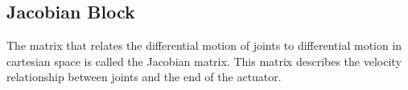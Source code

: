 \subsection{Jacobian Block}

The matrix that relates the differential motion of joints to differential motion in cartesian space is called the Jacobian matrix. This matrix describes the velocity relationship between joints and the end of the actuator.\cite{jacobian}

